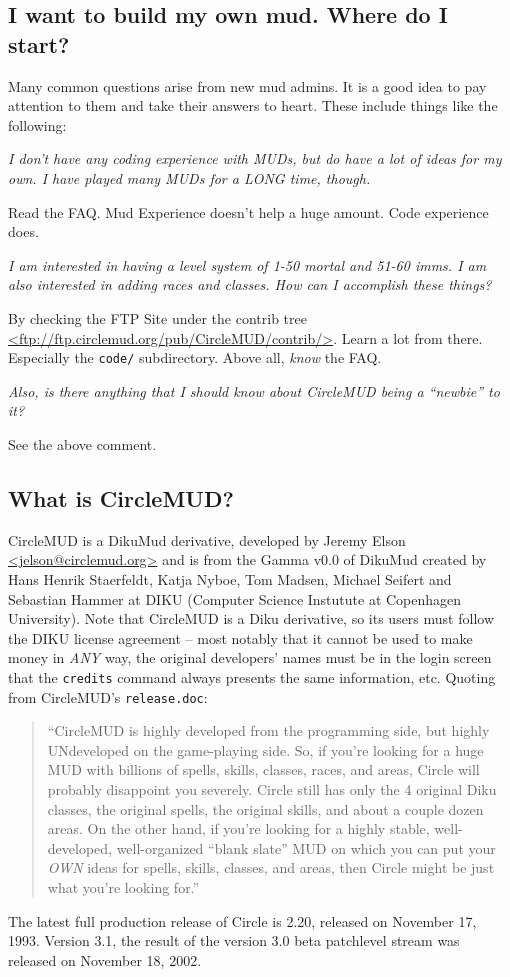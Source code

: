 \documentclass[11pt]{article}
\begin{document}
\subsection{I want to build my own mud.  Where do I start?}
Many common questions arise from new mud admins.  It is a good idea to pay attention to them and take their answers to heart.  These include things like the following:
\par
{\em I don't have any coding experience with MUDs, but do have a lot of ideas for my own.  I have played many MUDs for a LONG time, though.}
\par
Read the FAQ.  Mud Experience doesn't help a huge amount.  Code experience does.
\par
{\em I am interested in having a level system of 1-50 mortal and 51-60 imms.  I am also interested in adding races and classes. How can I accomplish these things?}
\par
By checking the FTP Site under the contrib tree \url{<ftp://ftp.circlemud.org/pub/CircleMUD/contrib/>}.  Learn a lot from there.  Especially the \texttt{code/} subdirectory.  Above all, {\em know} the FAQ.
\par
{\em Also, is there anything that I should know about CircleMUD being a ``newbie'' to it?}
\par
See the above comment.

\subsection{What is CircleMUD?}
CircleMUD is a DikuMud derivative, developed by Jeremy Elson \url{<jelson@circlemud.org>}
and is from the Gamma v0.0 of DikuMud created by Hans Henrik Staerfeldt, Katja Nyboe, Tom
Madsen, Michael Seifert and Sebastian Hammer at DIKU (Computer Science Instutute at Copenhagen University).  Note that CircleMUD is a Diku derivative, so its users must follow the DIKU license agreement -- most notably that it cannot be used to make money in {\em ANY} way, the original developers' names must be in the login screen that the \texttt{credits} command always presents the same information, etc.\newline
Quoting from CircleMUD's \texttt{release.doc}:
\begin{quote}
``CircleMUD is highly developed from the programming side, but highly UNdeveloped on the game-playing side.  So, if you're looking for a huge MUD with billions of spells, skills, classes, races, and areas, Circle will probably disappoint you severely.  Circle still has only the 4 original Diku classes, the original spells, the original skills, and about a couple dozen areas. On the other hand, if you're looking for a highly stable, well-developed, well-organized ``blank slate'' MUD on which you can put your {\em OWN} ideas for spells, skills, classes, and areas, then Circle might be just what you're looking for.''
\end{quote}
The latest full production release of Circle is 2.20, released on November 17, 1993.   Version 3.1, the result of the version 3.0 beta patchlevel stream was released on November 18, 2002.
\end{document}
